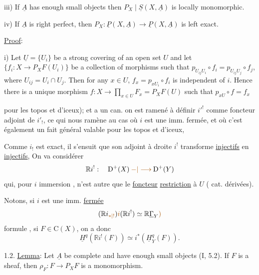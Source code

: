 iii) If $\underline{A}$ has enough small objects then $P_X\mid\underline{S}(X,\underline{A})$ is
locally monomorphic.

iv) If $\underline{A}$ is right perfect, then
$P_X:\underline{P}(X,\underline{A})\longrightarrow\underline{P}(X,\underline{A})$ is
left exact.

\uline{Proof}:

i) Let $\underline{U}=\{U_i\}$ be a strong covering of an open set $U$ and
let $\{f_i:X\longrightarrow P_XF(U_i)\}$ be a collection of morphisms such that
$p_{U_{ij}U_i}\circ f_i=p_{U_{ij}U_j}\circ f_j$, where $U_{ij}=U_i\cap U_j$. Then for any
$x\in U$, $f_x=p_{xU_i}\circ f_i$ is independent of $i$. Hence there is a
unique morphism $f:X\longrightarrow\prod_{x\in U}F_x=P_XF(U)$ such that $p_{xU}\circ f=f_x$


 pour les topos et  d'iceux);
et  a un  can.
on est ramené à définir  
$i'^!$ comme foncteur adjoint de $i'_!$, ce qui
nous ramène au cas où $i$ est une imm.
fermée, et où c'est également un fait général
valable pour les topos et  d'iceux,

 Comme $i_!$ est exact,  il s'ensuit
que son adjoint à droite $i^!$ transforme
\uline{injectifs} en \uline{injectifs},  On va
considérer
\[
\mathbb{R}i^!:\quad\mathrm{D}^+(X)\mathbin{\unsure{-|\longrightarrow}}\mathrm{D}^+(Y)
\]
qui, pour $i$ immersion , n'est
autre que le \uline{foncteur} \uline{restriction}
à $U$ ( cat. dérivées).

Notons, si
$i$ est une imm. \uline{fermée}
\[
(\mathbb{R}i_{\unsure{*|!}})\deleted{\unsure{i}}(\mathbb{R}i^!)\simeq \mathbb{R}\underline{\Gamma}_Y\deleted{\unsure{)}}
\]
formule  , 
si $F\in\mathrm{C}(X)$, on a donc
\[
\underline{H}^{q}(\mathbb{R}i^!(F))\simeq i^*(\underline{H}^{q}_Y(F)).
\]


1.2. \uline{Lemma}: Let $\underline{A}$ be complete and have enough small objects
(I, 5.2). If $F$ is a sheaf, then $\rho_F:F\longrightarrow P_XF$ is a
monomorphism.

